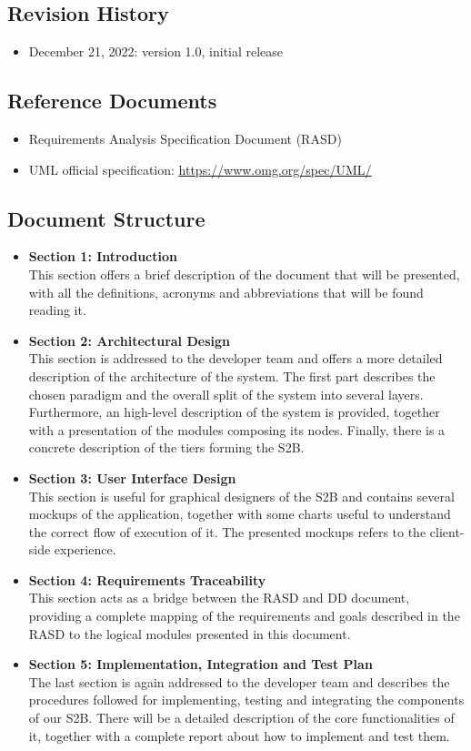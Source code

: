 \subsection{Revision History}
\begin{itemize}
    \item December 21, 2022: version 1.0, initial release
\end{itemize}
\subsection{Reference Documents}
\begin{itemize}
    \item Requirements Analysis Specification Document (RASD)
    \item UML official specification: \underline{\url{https://www.omg.org/spec/UML/}}
\end{itemize}
\subsection{Document Structure}
\begin{itemize}
    \item \textbf{Section 1: Introduction}\\This section offers a brief description of the document that will be presented, with all the definitions, acronyms and abbreviations that will be found reading it.
    \item \textbf{Section 2: Architectural Design}\\This section is addressed to the developer team and offers a more detailed description of the architecture of the system. The first part describes the chosen paradigm and the overall split of the system into several layers. Furthermore, an high-level description of the system is provided, together with a presentation of the modules composing its nodes. Finally, there is a concrete description of the tiers forming the S2B.
    \item \textbf{Section 3: User Interface Design}\\This section is useful for graphical designers of the S2B and contains several mockups of the application, together with some charts useful to understand the correct flow of execution of it. The presented mockups refers to the client-side experience.
    \item \textbf{Section 4: Requirements Traceability}\\This section acts as a bridge between the RASD and DD document, providing a complete mapping of the requirements and goals described in the RASD to the logical modules presented in this document.
    \item \textbf{Section 5: Implementation, Integration and Test Plan}\\The last section is again addressed to the developer team and describes the procedures followed for implementing, testing and integrating the components of our S2B. There will be a detailed description of the core functionalities of it, together with a complete report about how to implement and test them.
\end{itemize}
